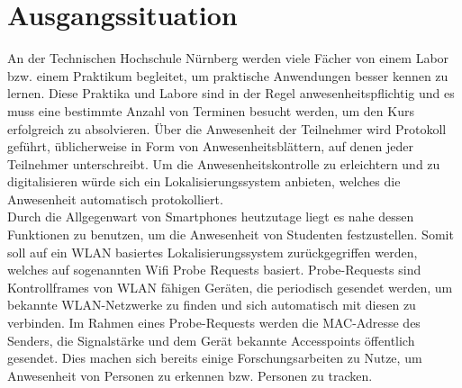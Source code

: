 \section{Ausgangssituation}

An der Technischen Hochschule Nürnberg werden viele Fächer von einem Labor bzw. einem Praktikum begleitet, um praktische Anwendungen besser kennen zu lernen.
Diese Praktika und Labore sind in der Regel anwesenheitspflichtig und es muss eine bestimmte Anzahl von Terminen besucht werden, um den Kurs erfolgreich zu absolvieren.
Über die Anwesenheit der Teilnehmer wird Protokoll geführt, üblicherweise in Form von Anwesenheitsblättern, auf denen jeder Teilnehmer unterschreibt.
Um die Anwesenheitskontrolle zu erleichtern und zu digitalisieren würde sich ein Lokalisierungssystem anbieten, welches die Anwesenheit automatisch protokolliert.
\\

Durch die Allgegenwart von Smartphones heutzutage liegt es nahe dessen Funktionen zu benutzen, um die Anwesenheit von Studenten festzustellen.
Somit soll auf ein WLAN basiertes Lokalisierungssystem zurückgegriffen werden, welches auf sogenannten Wifi Probe Requests basiert.
Probe-Requests sind Kontrollframes von WLAN fähigen Geräten, die periodisch gesendet werden, um bekannte WLAN-Netzwerke zu finden und sich automatisch mit diesen zu verbinden. \cite{wifiproberequests2019}
Im Rahmen eines Probe-Requests werden die MAC-Adresse des Senders, die Signalstärke und dem Gerät bekannte Accesspoints öffentlich gesendet.
Dies machen sich bereits einige Forschungsarbeiten zu Nutze, um Anwesenheit von Personen zu erkennen bzw. Personen zu tracken. \cite{sail2014,sherlock2018}
